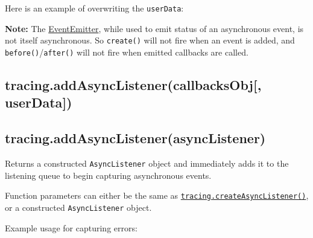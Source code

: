 Here is an example of overwriting the \texttt{userData}:

\begin{Shaded}
\begin{Highlighting}[]
\NormalTok{(\{}
  \NormalTok{: } 
     \NormalTok{;}
\NormalTok{\}, \{}
  \NormalTok{: } 
  \NormalTok{\}}
\NormalTok{\}, }\NormalTok{);}
\end{Highlighting}
\end{Shaded}

\textbf{Note:} The
\href{events.html\#events_class_events_eventemitter}{EventEmitter},
while used to emit status of an asynchronous event, is not itself
asynchronous. So \texttt{create()} will not fire when an event is added,
and \texttt{before()}/\texttt{after()} will not fire when emitted
callbacks are called.

\subsection{tracing.addAsyncListener(callbacksObj{[},
userData{]})}\label{tracing.addasynclistenercallbacksobj-userdata}

\subsection{tracing.addAsyncListener(asyncListener)}\label{tracing.addasynclistenerasynclistener}

Returns a constructed \texttt{AsyncListener} object and immediately adds
it to the listening queue to begin capturing asynchronous events.

Function parameters can either be the same as
\hyperref[tracingux5ftracingux5fcreateasynclistenerux5fasynclistenerux5fcallbacksobjux5fstoragevalue]{\texttt{tracing.createAsyncListener()}},
or a constructed \texttt{AsyncListener} object.

Example usage for capturing errors:

